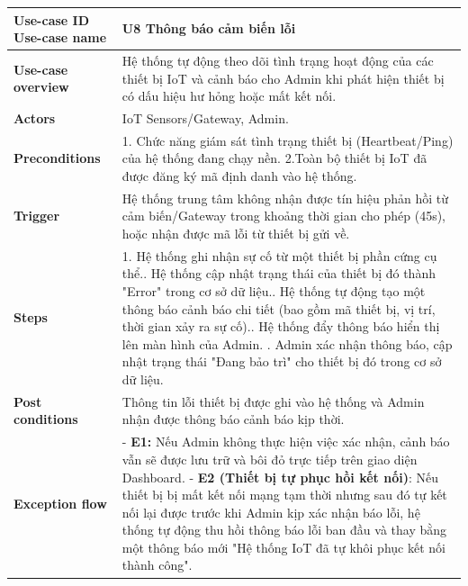\vspace{0.5cm}
\noindent
\begin{tabularx}{\textwidth}{|>{\raggedright\arraybackslash}p{4cm}|X|}
\hline
\textbf{Use-case ID} \newline \textbf{Use-case name} & U8 \newline \textbf{Thông báo cảm biến lỗi} \\ \hline
\textbf{Use-case overview} & Hệ thống tự động theo dõi tình trạng hoạt động của các thiết bị IoT và cảnh báo cho Admin khi phát hiện thiết bị có dấu hiệu hư hỏng hoặc mất kết nối. \\ \hline
\textbf{Actors} & IoT Sensors/Gateway, Admin. \\ \hline
\textbf{Preconditions} & 
1. Chức năng giám sát tình trạng thiết bị (Heartbeat/Ping) của hệ thống đang chạy nền. \newline
2.Toàn bộ thiết bị IoT đã được đăng ký mã định danh vào hệ thống.\\ \hline
\textbf{Trigger} & Hệ thống trung tâm không nhận được tín hiệu phản hồi từ cảm biến/Gateway trong khoảng thời gian cho phép (45s), hoặc nhận được mã lỗi từ thiết bị gửi về. \\ \hline
\textbf{Steps} & 
1. Hệ thống ghi nhận sự cố từ một thiết bị phần cứng cụ thể.\newline
2. Hệ thống cập nhật trạng thái của thiết bị đó thành "Error" trong cơ sở dữ liệu.\newline
3. Hệ thống tự động tạo một thông báo cảnh báo chi tiết (bao gồm mã thiết bị, vị trí, thời gian xảy ra sự cố).\newline
4. Hệ thống đẩy thông báo hiển thị lên màn hình của Admin. \newline
5. Admin xác nhận thông báo, cập nhật trạng thái "Đang bảo trì" cho thiết bị đó trong cơ sở dữ liệu.\\ \hline
\textbf{Post conditions} & Thông tin lỗi thiết bị được ghi vào hệ thống và Admin nhận được thông báo cảnh báo kịp thời. \\ \hline
\textbf{Exception flow} & 
- \textbf{E1:} Nếu Admin không thực hiện việc xác nhận, cảnh báo vẫn sẽ được lưu trữ và bôi đỏ trực tiếp trên giao diện Dashboard. \newline
- \textbf{E2 (Thiết bị tự phục hồi kết nối)}: Nếu thiết bị bị mất kết nối mạng tạm thời nhưng sau đó tự kết nối lại được trước khi Admin kịp xác nhận báo lỗi, hệ thống tự động thu hồi thông báo lỗi ban đầu và thay bằng một thông báo mới "Hệ thống IoT đã tự khôi phục kết nối thành công". \\ \hline
\end{tabularx}
\newpage
